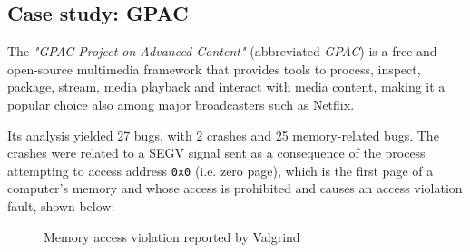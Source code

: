 \newpage
\subsection{Case study: GPAC}
The \textit{"GPAC Project on Advanced Content"} (abbreviated \textit{GPAC}) \cite{gpac} is a free and open-source multimedia framework that provides tools to process, inspect, package, stream, media playback and interact with media content, making it a popular choice also among major broadcasters such as Netflix.

Its analysis yielded 27 bugs, with 2 crashes and 25 memory-related bugs.
The crashes were related to a SEGV signal sent as a consequence of the process attempting to access address \verb|0x0| (i.e. zero page), which is the first page of a computer's memory and whose access is prohibited and causes an access violation fault, shown below:
\begin{figure}[h]
\caption{Memory access violation reported by Valgrind}
\label{fig:segv_gpac}
\end{figure}
\ \\

